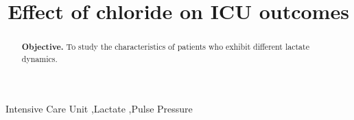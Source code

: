 \documentclass[preprint,12pt]{elsarticle}
\begin{document}
\begin{frontmatter}



\title{Effect of chloride on ICU outcomes}


\author{}

\address{Cambridge MA, United States}

\begin{abstract}
\textbf{Objective.} To study the characteristics of patients who exhibit different lactate dynamics.
\end{abstract}

\begin{keyword}
Intensive Care Unit \sep Lactate \sep Pulse Pressure


\end{keyword}

\end{frontmatter}

\linenumbers

\end{document}

